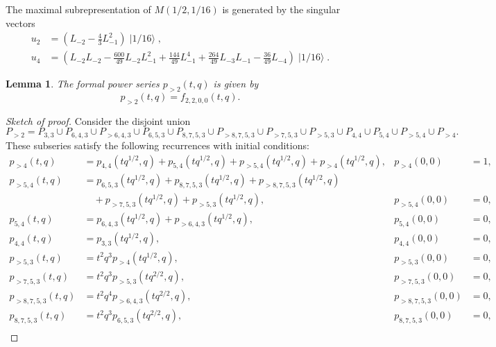 \documentclass[a4paper, 12pt, reqno]{amsart}
\newtheorem{lemma}[theorem]{Lemma}
\theoremstyle{remark}
\numberwithin{equation}{subsection}
\DeclareMathOperator{\vacsixteen}{|1/16\rangle}
\begin{document}
The maximal subrepresentation of $M(1/2, 1/16)$ is generated by the singular vectors
\begin{align*}
  u_2 &= (L_{-2} - \tfrac{4}{3}L_{-1}^2)\vacsixteen, \\
  u_4 &= (L_{-2}L_{-2} - \tfrac{600}{49}L_{-2}L_{-1}^2 + \tfrac{144}{49}L_{-1}^4 + \tfrac{264}{49}L_{-3}L_{-1} - \tfrac{36}{49}L_{-4})\vacsixteen.
\end{align*}

\begin{lemma}
  \label{lmm:36}
  The formal power series $p_{>2}(t, q)$ is given by
  \begin{equation*}
    p_{>2}(t, q) = f_{2, 2, 0, 0}(t, q).
  \end{equation*}
\end{lemma}

\begin{proof}[Sketch of proof]
  Consider the disjoint union
  \begin{equation*}
    P_{>2} = P_{3, 3} \cup P_{6, 4, 3} \cup P_{>6, 4, 3} \cup P_{6, 5, 3} \cup P_{8, 7, 5, 3} \cup P_{>8, 7, 5, 3} \cup P_{>7, 5, 3} \cup P_{>5, 3} \cup P_{4, 4} \cup P_{5, 4} \cup P_{>5, 4} \cup P_{>4}.
  \end{equation*}
  These subseries satisfy the following recurrences with initial conditions:
  \begin{align*}
    p_{>4}(t, q) &= p_{4, 4}(tq^{1/2}, q) + p_{5, 4}(tq^{1/2}, q) + p_{>5, 4}(tq^{1/2}, q) + p_{>4}(tq^{1/2}, q), &p_{>4}(0, 0) &= 1, \\
    p_{>5, 4}(t, q) &= p_{6, 5, 3}(tq^{1/2}, q) + p_{8, 7, 5, 3}(tq^{1/2}, q) + p_{>8, 7, 5, 3}(tq^{1/2}, q) \\
    &\quad + p_{>7, 5, 3}(tq^{1/2}, q) + p_{>5, 3}(tq^{1/2}, q), &p_{>5, 4}(0, 0) &= 0, \\
    p_{5, 4}(t, q) &= p_{6, 4, 3}(tq^{1/2}, q) + p_{>6, 4, 3}(tq^{1/2}, q), &p_{5, 4}(0, 0) &= 0, \\
    p_{4, 4}(t, q) &= p_{3, 3}(tq^{1/2}, q), &p_{4, 4}(0, 0) &= 0, \\
    p_{>5, 3}(t, q) &= t^2q^3p_{>4}(tq^{1/2}, q), &p_{>5, 3}(0, 0) &= 0, \\
    p_{>7, 5, 3}(t, q) &= t^2q^3p_{>5, 3}(tq^{2/2}, q), &p_{>7, 5, 3}(0, 0) &= 0, \\
    p_{>8, 7, 5, 3}(t, q) &= t^2q^4p_{>6, 4, 3}(tq^{2/2}, q), &p_{>8, 7, 5, 3}(0, 0) &= 0, \\
    p_{8, 7, 5, 3}(t, q) &= t^2q^3p_{6, 5, 3}(tq^{2/2}, q), &p_{8, 7, 5, 3}(0, 0) &= 0, \\

\end{align*}
\end{proof}
\end{document}
